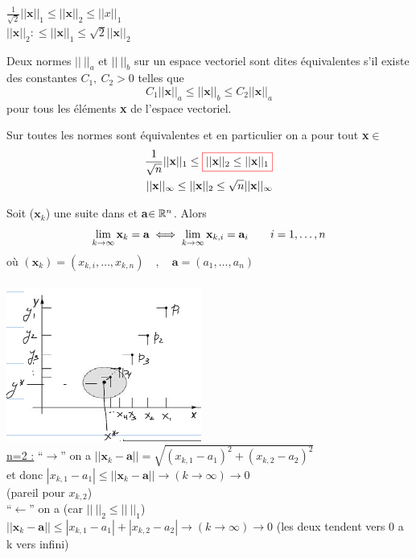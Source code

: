 \documentclass[12pt,a4paper]{article}
\begin{document}
$\frac{1}{\sqrt{2}}||\textbf{x}||_1 \leq ||\textbf{x}||_2 \leq ||x||_1$\\
$||\textbf{x}||_2:  \leq ||\textbf{x}||_1 \leq \sqrt{2}||\textbf{x}||_2$
\begin{boite}
	 Deux normes $||\ ||_a$ et $||\ ||_b$ sur un espace vectoriel sont dites équivalentes s'il existe des constantes $C_1,\ C_2 > 0$ telles que 
	\begin{equation*}
		C_1||\textbf{x}||_a \leq ||\textbf{x}||_b \leq C_2||\textbf{x}||_a
	\end{equation*}
	pour tous les éléments \textbf{x} de l'espace vectoriel.
\end{boite}
\begin{boite}
	 Sur \rn toutes les normes sont équivalentes et en particulier on a pour tout \textbf{x}$\in$ \rn
	\begin{align*}
		\frac{1}{\sqrt{n}}||\textbf{x}||_1 \leq \text{\fcolorbox{red}{white}{$||\textbf{x}||_2 \leq ||\textbf{x}||_1$}}\\
		||\textbf{x}||_\infty \leq ||\textbf{x}||_2 \leq \sqrt{n}||\textbf{x}||_\infty
		\end{align*}
\end{boite}
 Soit ($\textbf{x}_k$) une suite dans \rn et \textbf{a}$\in \mathbb{R}^n$. Alors 
\begin{equation*}
	\lim\limits_{k\to\infty}\textbf{x}_k = \textbf{a} \iff \lim\limits_{k\to\infty}\textbf{x}_{k,i} = \textbf{a}_i \qquad i = 1,\ldots,n
\end{equation*}
où $(\textbf{x}_k) = (x_{k,i},\ldots,x_{k,n}) \quad , \quad \textbf{a} = (a_1,\ldots,a_n)$\\
\\
\includegraphics[scale=0.5]{images/demonstration}\\
\underline{n=2 :} \enquote{$\to$} on a $||\textbf{x}_k - \textbf{a}|| = \sqrt{(x_{k,1} - a_1)^2 + (x_{k,2} -a_2)^2}$\\
et donc $|x_{k,1}-a_1| \leq ||\textbf{x}_k - \textbf{a}|| \to (k\to\infty) \to 0$\\
(pareil pour $x_{k,2}$)\\
\enquote{$\leftarrow$} on a (car $||\ ||_2 \leq ||\ ||_1$)\\
$||\textbf{x}_k - \textbf{a}|| \leq |x_{k,1} - a_1| + |x_{k,2} -a_2| \to (k\to\infty)\to 0$ (les deux tendent vers 0 a k vers infini)
\end{document}
